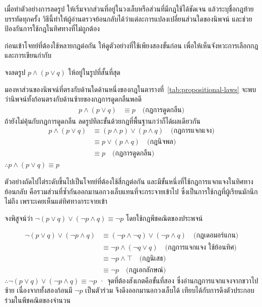 เมื่อทำตัวอย่างการลดรูป ให้เริ่มจากส่วนที่อยู่ในวงเล็บหรือส่วนที่มีกฎใช้ได้ชัดเจน แล้วระบุชื่อกฎท้ายบรรทัดทุกครั้ง วิธีนี้ทำให้ผู้อ่านตรวจย้อนกลับได้ว่าแต่ละการแปลงเปลี่ยนส่วนใดของนิพจน์ และช่วยป้องกันการใช้กฎในทิศทางที่ไม่ถูกต้อง

ก่อนเข้าโจทย์ที่ต้องใช้หลายกฎต่อกัน ให้ดูตัวอย่างที่ใช้เพียงสองขั้นก่อน เพื่อให้เห็นจังหวะการเลือกกฎและการเขียนกำกับ

\begin{ex}
\label{ex:simplify-two-steps}
จงลดรูป $p \land (p \lor q)$ ให้อยู่ในรูปที่สั้นที่สุด
\end{ex}

\begin{solution}
มองหาส่วนของนิพจน์ที่ตรงกับด้านใดด้านหนึ่งของกฎในตารางที่~\ref{tab:propositional-laws} จะพบว่านิพจน์ทั้งก้อนตรงกับด้านซ้ายของกฎการดูดกลืนพอดี
\begin{align*}
p \land (p \lor q) &\equiv p \quad \text{(กฎการดูดกลืน)}
\end{align*}
ถ้ายังไม่คุ้นกับกฎการดูดกลืน ลดรูปทีละขั้นด้วยกฎที่พื้นฐานกว่าก็ได้ผลเดียวกัน
\begin{align*}
p \land (p \lor q) &\equiv (p \land p) \lor (p \land q) \quad \text{(กฎการแจกแจง)}\\
                   &\equiv p \lor (p \land q) \quad \text{(กฎนิจพล)}\\
                   &\equiv p \quad \text{(กฎการดูดกลืน)}
\end{align*}
$\therefore p \land (p \lor q) \equiv p$ \solhere
\end{solution}

ตัวอย่างถัดไปไต่ระดับขึ้นไปเป็นโจทย์ที่ต้องใช้สี่กฎต่อกัน และมีขั้นหนึ่งที่ใช้กฎการแจกแจงในทิศทางย้อนกลับ คือรวมส่วนที่ซ้ำกันออกมานอกวงเล็บแทนที่จะกระจายเข้าไป ซึ่งเป็นการใช้กฎที่ผู้เรียนมักนึกไม่ถึง เพราะเคยเห็นแต่ทิศทางกระจายเข้า

\begin{ex}
\label{ex:simplify-by-laws}
จงพิสูจน์ว่า $\neg(p \lor q) \lor (\neg p \land q) \equiv \neg p$ โดยใช้กฎพีชคณิตของประพจน์
\end{ex}

\begin{solution}
\begin{align*}
\neg(p \lor q) \lor (\neg p \land q) &\equiv (\neg p \land \neg q) \lor (\neg p \land q) \quad \text{(กฎเดอมอร์แกน)} \\
&\equiv \neg p \land (\neg q \lor q) \quad \text{(กฎการแจกแจง ใช้ย้อนทิศ)} \\
&\equiv \neg p \land \top \quad \text{(กฎนิเสธ)} \\
&\equiv \neg p \quad \text{(กฎเอกลักษณ์)}
\end{align*}
$\therefore \neg(p \lor q) \lor (\neg p \land q) \equiv \neg p$ · จุดที่ต้องสังเกตคือขั้นที่สอง ซึ่งอ่านกฎการแจกแจงจากขวาไปซ้าย เนื่องจากทั้งสองก้อนมี $\neg p$ เป็นตัวร่วม จึงดึงออกมานอกวงเล็บได้ เทียบได้กับการดึงตัวประกอบร่วมในพีชคณิตของจำนวน \solhere
\end{solution}

